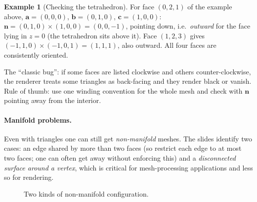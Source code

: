 \documentclass[11pt,a4paper]{article}
\newcommand{\vn}{\bm{n}}
\newcommand{\va}{\bm{a}}
\newcommand{\vb}{\bm{b}}
\newcommand{\vc}{\bm{c}}
\theoremstyle{definition}
\newtheorem{example}[definition]{Example}
\theoremstyle{plain}
\theoremstyle{remark}
\begin{document}
\begin{example}[Checking the tetrahedron]
For face $(0,2,1)$ of the example above, $\va=(0,0,0)$, $\vb=(0,1,0)$, $\vc=(1,0,0)$: $\vn=(0,1,0)\times(1,0,0)=(0,0,-1)$, pointing down, i.e.\ \emph{outward} for the face lying in $z=0$ (the tetrahedron sits above it). Face $(1,2,3)$ gives $(-1,1,0)\times(-1,0,1)=(1,1,1)$, also outward. All four faces are consistently oriented.
\end{example}

\begin{intuition}
The ``classic bug'': if some faces are listed clockwise and others counter-clockwise, the renderer treats some triangles as back-facing and they render black or vanish. Rule of thumb: use one winding convention for the whole mesh and check with $\vn$ pointing away from the interior.
\end{intuition}

\paragraph{Manifold problems.}
Even with triangles one can still get \emph{non-manifold} meshes. The slides identify two cases: an edge shared by more than two faces (so restrict each edge to at most two faces; one can often get away without enforcing this) and a \emph{disconnected surface around a vertex}, which is critical for mesh-processing applications and less so for rendering.

\begin{figure}[ht]
\centering
{}
\caption{Two kinds of non-manifold configuration.}
\end{figure}
\end{document}

